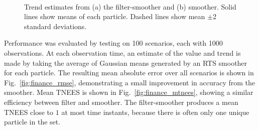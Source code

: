 \documentclass[10pt,twocolumn,twoside]{IEEEtran}
\begin{document}
\begin{figure}[!t]
\centering
{} \\
\caption{Trend estimates from (a) the filter-smoother and (b) smoother. Solid lines show means of each particle. Dashed lines show mean $\pm$2 standard deviations.}
\label{fig:example_state}
\end{figure}
%
Performance was evaluated by testing on 100 scenarios, each with 1000 observations. At each observation time, an estimate of the value and trend is made by taking the average of Gaussian means generated by an RTS smoother for each particle. The resulting mean absolute error over all scenarios is shown in Fig.~\ref{fig:finance_rmse}, demonstrating a small improvement in accuracy from the smoother. Mean TNEES is shown in Fig.~\ref{fig:finance_mtnees}, showing a similar efficiency between filter and smoother. The filter-smoother produces a mean TNEES close to $1$ at most time instants, because there is often only one unique particle in the set.%
%
\end{document}

